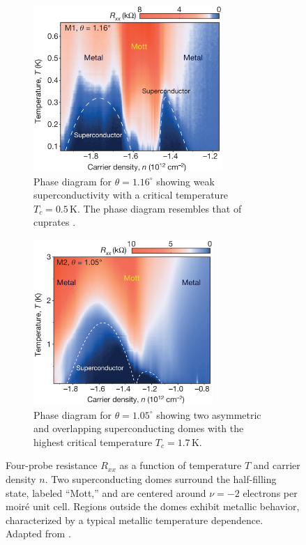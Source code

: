 \begin{figure}[H]
\centering
\begin{subfigure}{.48\textwidth}
  \centering
  \includegraphics[height=17em]{fig/tbg_Tc_superconductivity_M1.png}
  \caption{Phase diagram for \(\theta = 1.16^\circ\) showing weak superconductivity with a critical temperature \(T_c = 0.5 \, \text{K}\). The phase diagram resembles that of cuprates \cite{cuprate_superconductivity_lee2006}.}
  \label{fig:tbg_superconductivity_a}
\end{subfigure} \hfill
\begin{subfigure}{.48\textwidth}
  \centering
  \includegraphics[height=17em]{fig/tbg_Tc_superconductivity_M2.png}
  \caption{Phase diagram for \(\theta = 1.05^\circ\) showing two asymmetric and overlapping superconducting domes with the highest critical temperature \(T_c = 1.7 \, \text{K}\).}
  \label{fig:tbg_superconductivity_b}
\end{subfigure}
\caption{Four-probe resistance \(R_{xx}\) as a function of temperature $T$ and carrier density $n$. Two superconducting domes surround the half-filling state, labeled ``Mott,'' and are centered around \(\nu = -2\) electrons per moiré unit cell. Regions outside the domes exhibit metallic behavior, characterized by a typical metallic temperature dependence. Adapted from \cite{cao2018}.}
\label{fig:tbg_superconductivity}
\end{figure}

